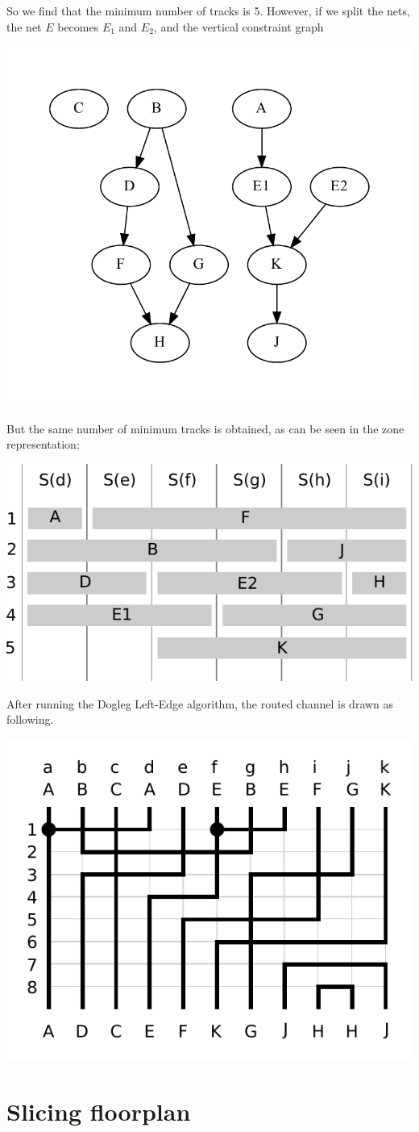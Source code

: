 \documentclass[a4paper]{article}
\begin{document}
%
So we find that the minimum number of tracks is 5. However, if we split the 
nets, the net $E$ becomes $E_1$ and $E_2$, and the vertical constraint graph
%
\begin{center}
\includegraphics[width=.6\textwidth]{vertical-split.pdf}
\end{center}
%
But the same number of minimum tracks is obtained, as can be seen in the zone 
representation:
%
\begin{center}
\includegraphics[width=.5\textwidth]{zone-repr-split.pdf}
\end{center}
%
After running the Dogleg Left-Edge algorithm, the routed channel is drawn as 
following.
%
\begin{center}
\includegraphics[width=.4\textwidth]{route2.pdf}
\end{center}
%
\newpage

\section{Slicing floorplan}
\end{document}

